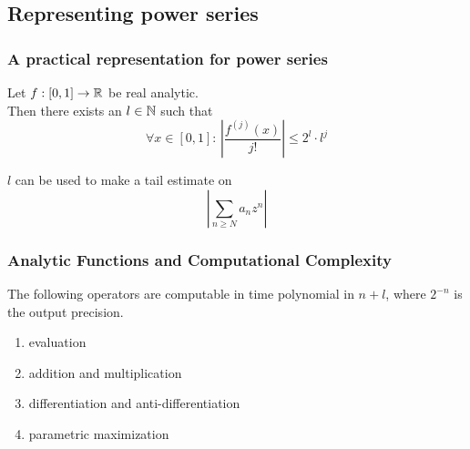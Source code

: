 
\subsection{Representing power series}
\begin{frame}
\frametitle{A practical representation for power series}
\begin{lemma}
  Let $f : [0,1] \to \mathbb{R}$ be real analytic.\\
  Then there exists an $l \in \mathbb{N}$ such that 
  $$ \forall x \in [0,1]: \, \left | \frac{f^{(j)}(x)}{j!} \right | \leq 2^l\cdot l^j $$
\end{lemma}
\pause
$l$ can be used to make a tail estimate on
$$ \left | \sum_{n \geq N} a_n z^n \right |  $$
\end{frame}
\begin{frame}[<+->]
\frametitle{Analytic Functions and Computational Complexity}
\begin{theorem}
  The following operators are computable in time polynomial in $n+l$, where $2^{-n}$ is the output precision.
\begin{enumerate}
\item evaluation
\item addition and multiplication
\item differentiation and anti-differentiation
\item parametric maximization
\end{enumerate}
\end{theorem}
\end{frame}
